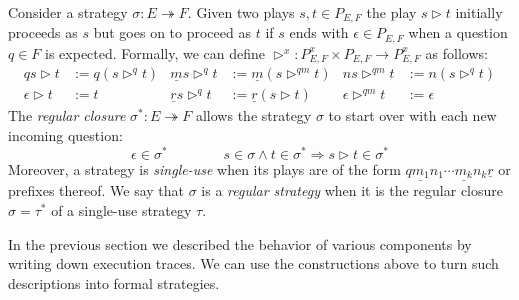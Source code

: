 \documentclass[acmsmall,nonacm]{acmart}
\newcommand{\kw}[1]{\ensuremath{ \mathsf{#1} }}
\begin{document}
\begin{definition}
Consider a strategy $\sigma : E \twoheadrightarrow F$.
Given two plays $s, t \in P_{E,F}$
the play $s \rhd t$ initially proceeds as $s$
but goes on to proceed as $t$ if $s$ ends
with $\epsilon \in P_{E,F}$
when a question $q \in F$ is expected.
Formally,
we can define
$\rhd^x : P_{E,F}^x \times P_{E,F} \rightarrow P_{E,F}^x$
as follows:
\begin{align*}
  qs \rhd t &:= q ( s \rhd^q t ) &
  \underline{m} s \rhd^q t &:= \underline{m} (s \rhd^{qm} t) &
  n s \rhd^{qm} t &:= n (s \rhd^q t) \\
  \epsilon \rhd t &:= t &
  \underline{r} s \rhd^q t &:= \underline{r} (s \rhd t) &
  \epsilon \rhd^{qm} t &:= \epsilon
\end{align*}
The \emph{regular closure} $\sigma^* : E \twoheadrightarrow F$
allows the strategy $\sigma$
to start over with each new incoming question:
\[
  \epsilon \in \sigma^*
  \qquad \qquad
  s \in \sigma \wedge t \in \sigma^* \Rightarrow
  s \rhd t \in \sigma^*
\]
Moreover,
a strategy is \emph{single-use}
when its plays are of the form
$ q \underline{m_1} n_1 \cdots \underline{m_k} n_k \underline{r} $
or prefixes thereof.
We say that $\sigma$ is a \emph{regular strategy}
when it is the regular closure $\sigma = \tau^*$
of a single-use strategy $\tau$.
\end{definition}


In the previous section
we described the behavior of various components
by writing down execution traces.
We can use the constructions above to turn such descriptions
into formal strategies.

\end{document}
